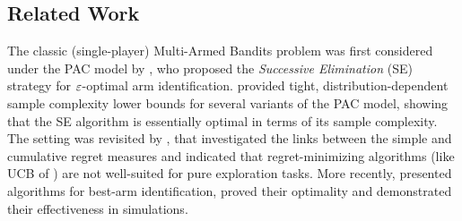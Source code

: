 %
%



\subsection{Related Work}


The classic (single-player) Multi-Armed Bandits problem was first considered under the PAC model by \citet{evendar02}, who proposed the \emph{Successive Elimination} (SE) strategy for $\varepsilon$-optimal arm identification.
\citet{mannor04} provided tight, distribution-dependent sample complexity lower bounds for several variants of the PAC model, showing that the SE algorithm is essentially optimal in terms of its sample complexity. 
The setting was revisited by \citet{bubeck2009pure}, that investigated the links between the simple and cumulative regret measures and indicated that regret-minimizing algorithms (like UCB of \citet{auer2002finite}) are not well-suited for pure exploration tasks. 
More recently, \citet{audibert10} presented algorithms for best-arm identification, proved their optimality and demonstrated their effectiveness in simulations.

